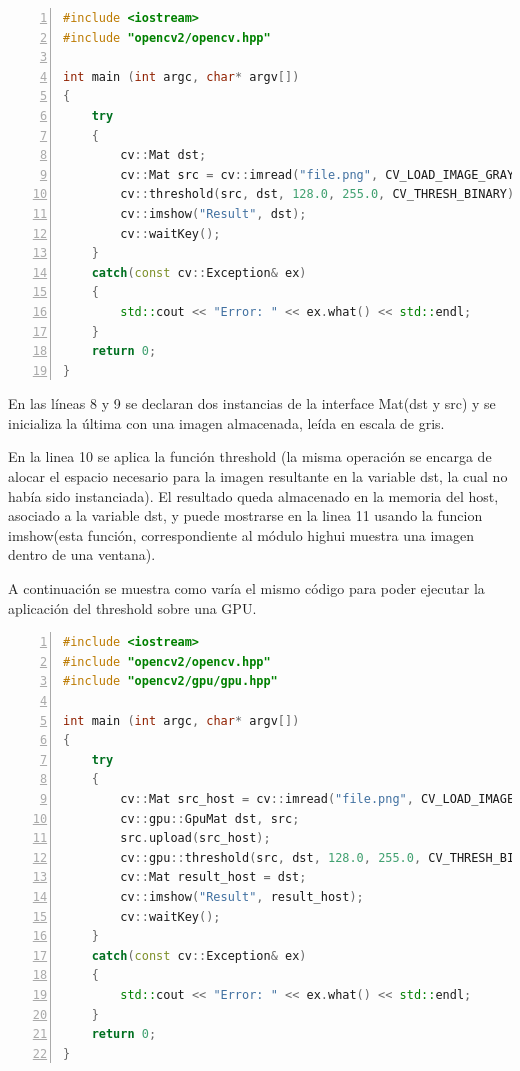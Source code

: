\documentclass[a4paper,10pt]{report}
\begin{document}
\begin{lstlisting}[frame=bt,title={aa},caption={Aplicar threshold a imagen en gris - CPU},
columns=fullflexible,numbers=left,backgroundcolor=\color{LemonChiffon1},basicstyle=\footnotesize,keywordstyle=\ttfamily\footnotesize,language=C++,stringstyle=\ttfamily,breaklines=true,xleftmargin=0.5em,xrightmargin=0pt,aboveskip=\bigskipamount,belowskip=\bigskipamount]
#include <iostream>
#include "opencv2/opencv.hpp"

int main (int argc, char* argv[])
{
    try
    {
        cv::Mat dst;
        cv::Mat src = cv::imread("file.png", CV_LOAD_IMAGE_GRAYSCALE);
        cv::threshold(src, dst, 128.0, 255.0, CV_THRESH_BINARY);
        cv::imshow("Result", dst);
        cv::waitKey();
    }
    catch(const cv::Exception& ex)
    {
        std::cout << "Error: " << ex.what() << std::endl;
    }
    return 0;
}

\end{lstlisting}

En las líneas 8 y 9 se declaran dos instancias de la interface Mat(dst y src) y se inicializa la última con una imagen almacenada, leída en escala de gris.

En la linea 10 se aplica la función threshold  (la misma operación se encarga de alocar el espacio necesario para la imagen resultante en la variable dst, la cual no había sido instanciada).
El resultado queda almacenado en la memoria del host, asociado a la variable dst, y puede mostrarse en la linea 11 usando la funcion imshow(esta función, correspondiente al módulo highui muestra una imagen dentro de una ventana).

A continuación se muestra como varía el mismo código para poder ejecutar la aplicación del threshold sobre una GPU.

\begin{lstlisting}[frame=bt,title={aa},caption={Aplicar threshold a imagen en gris - GPU},
columns=fullflexible,numbers=left,backgroundcolor=\color{LemonChiffon1},basicstyle=\footnotesize,keywordstyle=\ttfamily\footnotesize,language=C++,stringstyle=\ttfamily,breaklines=true,xleftmargin=0.5em,xrightmargin=0pt,aboveskip=\bigskipamount,belowskip=\bigskipamount]
#include <iostream>
#include "opencv2/opencv.hpp"
#include "opencv2/gpu/gpu.hpp"

int main (int argc, char* argv[])
{
    try
    {
        cv::Mat src_host = cv::imread("file.png", CV_LOAD_IMAGE_GRAYSCALE);
        cv::gpu::GpuMat dst, src;
        src.upload(src_host);
        cv::gpu::threshold(src, dst, 128.0, 255.0, CV_THRESH_BINARY);
        cv::Mat result_host = dst;
        cv::imshow("Result", result_host);
        cv::waitKey();
    }
    catch(const cv::Exception& ex)
    {
        std::cout << "Error: " << ex.what() << std::endl;
    }
    return 0;
}

\end{lstlisting}
\end{document}
